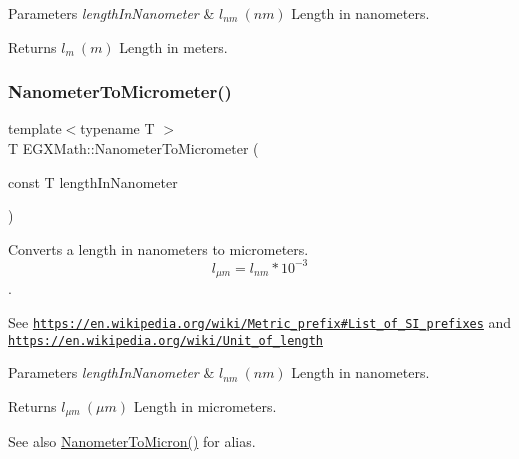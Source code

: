 \begin{DoxyParams}{Parameters}
{\em length\+In\+Nanometer} & $ l_{nm}\ (nm)$ Length in nanometers. \\
\hline
\end{DoxyParams}
\begin{DoxyReturn}{Returns}
$ l_{m}\ (m)$ Length in meters. 
\end{DoxyReturn}
\mbox{\label{group___e_g_x_math-_conversions-_length_conversions-_nanometer-_s_i_gaa539df5d709bface86429c8a25d7f6e1}} 
\subsubsection{\texorpdfstring{Nanometer\+To\+Micrometer()}{NanometerToMicrometer()}}
{\footnotesize\ttfamily template$<$typename T $>$ \\
T E\+G\+X\+Math\+::\+Nanometer\+To\+Micrometer (\begin{DoxyParamCaption}\item[{const T}]{length\+In\+Nanometer }\end{DoxyParamCaption})}



Converts a length in nanometers to micrometers. \[ l_{\mu m}=l_{nm} * 10^{-3} \]. 

See \href{https://en.wikipedia.org/wiki/Metric_prefix#List_of_SI_prefixes}{\tt https\+://en.\+wikipedia.\+org/wiki/\+Metric\+\_\+prefix\#\+List\+\_\+of\+\_\+\+S\+I\+\_\+prefixes} and \href{https://en.wikipedia.org/wiki/Unit_of_length}{\tt https\+://en.\+wikipedia.\+org/wiki/\+Unit\+\_\+of\+\_\+length} 
\begin{DoxyParams}{Parameters}
{\em length\+In\+Nanometer} & $ l_{nm}\ (nm)$ Length in nanometers. \\
\hline
\end{DoxyParams}
\begin{DoxyReturn}{Returns}
$ l_{\mu m}\ (\mu m)$ Length in micrometers. 
\end{DoxyReturn}
\begin{DoxySeeAlso}{See also}
\mbox{\hyperlink{group___e_g_x_math-_conversions-_length_conversions-_nanometer-_non-_s_i_ga278b008cafd5027568e16cbc8af7fb6a}{Nanometer\+To\+Micron()}} for alias. 
\end{DoxySeeAlso}
\mbox{\label{group___e_g_x_math-_conversions-_length_conversions-_nanometer-_s_i_gac8b870837f9a0213c8383079437e8cc6}} 

